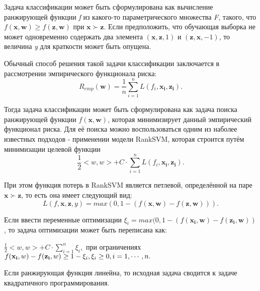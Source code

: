 \documentclass[12pt,a4paper,oneside]{article}
\begin{document}
\begin{multicols}{2}
\par
Задача классификации может быть сформулирована как вычисление ранжирующей функции \emph{f} из какого-то параметрического множества \emph{F}, такого, что \(f(\mathbf{x}, \mathbf{w}) \geq f(\mathbf{z}, \mathbf{w})\) при \(\mathbf{x} \succ \mathbf{z}\). 
Если предположить, что обучающая выборка не может одновременно содержать два элемента \((\mathbf{x}, \mathbf{z}, 1)\) и \((\mathbf{z}, \mathbf{x}, -1)\), то величина \emph{y} для краткости может быть опущена. 

\par
Обычный способ решения такой задачи классификации заключается в рассмотрении эмпирического функционала риска:
\[
R_{emp}(\mathbf{w}) = \frac{1}{n} \sum \limits_{i=1}^n L(f_i, \mathbf{x_i}, \mathbf{z_i}).
\]

\par
Тогда задача классификации может быть сформулирована как задача поиска ранжирующей функции \(f(\mathbf{x}, \mathbf{w})\), которая минимизирует данный эмпирический функционал риска. Для её поиска можно воспользоваться одним из наболее известных подходов - применении модели RankSVM, которая строится путём минимизации целевой функции 
\[
\frac{1}{2} <w, w> + C \cdot \sum \limits_{i=1}^n L(f_i, \mathbf{x_i}, \mathbf{z_i}).
\] 

\par
При этом функция потерь в RankSVM является петлевой, определённой на паре \(\mathbf{x} \succ \mathbf{z}\), то есть она имеет следующий вид:
\[
L(f, \mathbf{x}, \mathbf{z}, y) = max(0, 1 - (f(\mathbf{x}, \mathbf{w}) - f(\mathbf{z}, \mathbf{w}))).
\]

\par
Если ввести переменные оптимизации \(\xi_i = max(0, 1 - (f(\mathbf{x_i}, \mathbf{w}) - f(\mathbf{z_i}, \mathbf{w}))\), то задача оптимизации может быть переписана как:
\begin{center}
\(\frac{1}{2}<w, w> + C \cdot \sum \limits_{i=1}^n \xi_i,\) при ограничениях \\
\(f(\mathbf{x_i}, w) - f(\mathbf{z_i}, w) \geq 1 - \xi_i, \\
\xi_i \geq 0, i = 1, \cdots, n.\)
\end{center}

\par
Если ранжирующая функция линейна, то исходная задача сводится к задаче квадратичного программирования.



\end{multicols}
\end{document}
